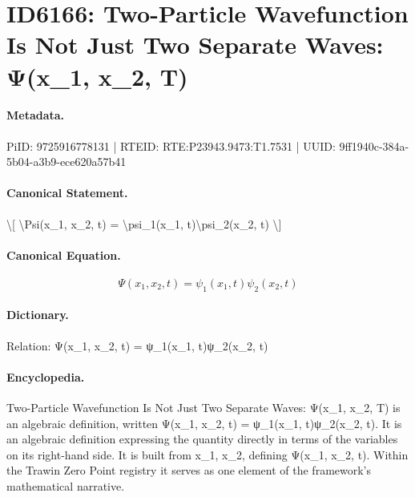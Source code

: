 \section*{ID6166: Two-Particle Wavefunction Is Not Just Two Separate Waves: Ψ(x\_1, x\_2, T)}
\paragraph{Metadata.}
PiID: 9725916778131 | RTEID: RTE:P23943.9473:T1.7531 | UUID: 9ff1940c-384a-5b04-a3b9-ece620a57b41

\paragraph{Canonical Statement.}
\textbackslash{}[ \textbackslash{}Psi(x\_1, x\_2, t) = \textbackslash{}psi\_1(x\_1, t)\textbackslash{}psi\_2(x\_2, t) \textbackslash{}]

\paragraph{Canonical Equation.}
\[
\Psi(x_1, x_2, t) = \psi_1(x_1, t)\psi_2(x_2, t)
\]

\paragraph{Dictionary.}
Relation: Ψ(x\_1, x\_2, t) = ψ\_1(x\_1, t)ψ\_2(x\_2, t)

\paragraph{Encyclopedia.}
Two-Particle Wavefunction Is Not Just Two Separate Waves: Ψ(x\_1, x\_2, T) is an algebraic definition, written Ψ(x\_1, x\_2, t) = ψ\_1(x\_1, t)ψ\_2(x\_2, t). It is an algebraic definition expressing the quantity directly in terms of the variables on its right-hand side. It is built from x\_1, x\_2, defining Ψ(x\_1, x\_2, t). Within the Trawin Zero Point registry it serves as one element of the framework's mathematical narrative.
